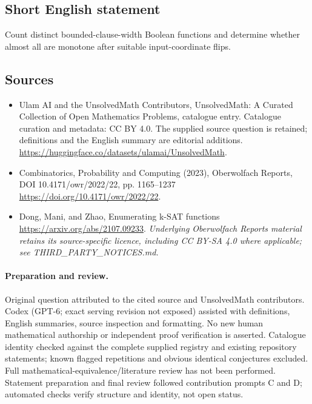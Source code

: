 \documentclass[11pt]{article}
\begin{document}
\subsection{Short English statement}
Count distinct bounded-clause-width Boolean functions and determine whether almost all are monotone after suitable input-coordinate flips.
\subsection{Sources}
\begin{itemize}
\item[\hypertarget{source:statement:1}{S1}] Ulam AI and the UnsolvedMath Contributors, UnsolvedMath: A Curated Collection of Open Mathematics Problems, catalogue entry. Catalogue curation and metadata: CC BY 4.0. The supplied source question is retained; definitions and the English summary are editorial additions.
\url{https://huggingface.co/datasets/ulamai/UnsolvedMath}.
\item[\hypertarget{source:statement:2}{S2}] Combinatorics, Probability and Computing (2023), Oberwolfach Reports, DOI 10.4171/owr/2022/22, pp. 1165--1237
\url{https://doi.org/10.4171/owr/2022/22}.
\item[\hypertarget{source:statement:3}{S3}] Dong, Mani, and Zhao, Enumerating k-SAT functions
\url{https://arxiv.org/abs/2107.09233}.
\textit{Underlying Oberwolfach Reports material retains its source-specific licence, including CC BY-SA 4.0 where applicable; see THIRD\_PARTY\_NOTICES.md.}
\end{itemize}
\paragraph{Preparation and review.}
Original question attributed to the cited source and UnsolvedMath contributors. Codex (GPT-6; exact serving revision not exposed) assisted with definitions, English summaries, source inspection and formatting. No new human mathematical authorship or independent proof verification is asserted. Catalogue identity checked against the complete supplied registry and existing repository statements; known flagged repetitions and obvious identical conjectures excluded. Full mathematical-equivalence/literature review has not been performed. Statement preparation and final review followed contribution prompts C and D; automated checks verify structure and identity, not open status.
\label{end:statement}
\end{document}
